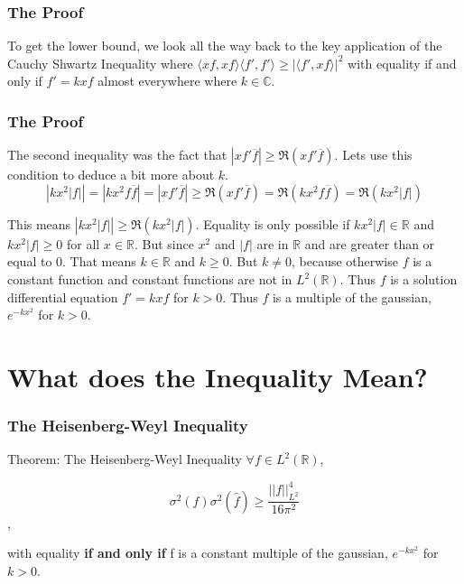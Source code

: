 \documentclass{beamer}
\newcommand{\C}{\mathbb{C}}
\newcommand{\h}[1]{\hat{#1}}
\newcommand{\R}{\mathbb{R}}
\newcommand{\aabs}[1]{\left\lvert\left\lvert #1\right\rvert\right\rvert}
\newcommand{\abs}[1]{\left\lvert #1\right\rvert}
\newcommand{\angles}[1]{\langle #1 \rangle}
\begin{document}
\begin{frame}
    \frametitle{The Proof}

    To get the lower bound, we look all the way back to the key application of the Cauchy Shwartz Inequality where $\angles{xf, xf}\angles{f', f'} \geq \abs{\angles{f', xf}}^2$ with equality if and only if $f' = kxf$ almost everywhere where $k \in \C$. 

\end{frame}

\begin{frame}
    \frametitle{The Proof}

    The second inequality was the fact that $|xf'\overline{f}|  \geq \Re(xf'\overline{f})$.  Lets use this condition to deduce a bit more about $k$.
    \[
       \abs{kx^2 \abs{f}} = \abs{kx^2 f \overline{f}} = |xf'\overline{f}| \geq \Re(xf'\overline{f}) = \Re(k x^2 f \overline{f}) = \Re(kx^2 \abs{f})
    \]

    This means $\abs{kx^2 \abs{f}} \geq \Re(kx^2 \abs{f})$. Equality is only possible if $kx^2 \abs{f} \in \R$ and $kx^2 \abs{f} \geq 0$ for all $x \in \R$. But since $x^2$ and $\abs{f}$ are in $\R$ and are greater than or equal to 0. That means $k \in \R$ and $k \geq 0$. But $k \neq 0$, because otherwise $f$ is a constant function and constant functions are not in $L^2(\R)$. Thus $f$ is a solution differential equation $f' = kxf$ for $k > 0$.  Thus $f$ is a multiple of the gaussian, $e^{-kx^2}$ for $k > 0$.                   

\end{frame}

\section{What does the Inequality Mean?}

\begin{frame}
    \frametitle{The Heisenberg-Weyl Inequality}

    \begin{block}{Theorem: The Heisenberg-Weyl Inequality}
        $\forall f \in L^2(\R)$, 
        
        \[
            \sigma^2(f)\sigma^2(\h{f}) \geq \frac{\aabs{f}_{L^2}^4}{16 \pi^2}
        \],

        with equality \textbf{if and only if} f is a constant multiple of the gaussian, $e^{-kx^2}$ for $k > 0$.    
    \end{block}

\end{frame}
\end{document}

